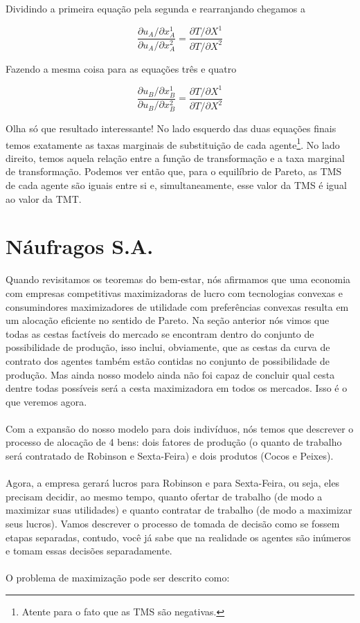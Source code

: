 \documentclass[a4paper,11pt,oneside]{book}
\theoremstyle{definition}
\theoremstyle{break}
\begin{document}
Dividindo a primeira equação pela segunda e rearranjando chegamos a

$$ \frac{\partial u_A/\partial x^1_A}{\partial u_A/\partial x^2_A} = \frac{\partial T/\partial X^1}{\partial T/\partial X^2} $$

Fazendo a mesma coisa para as equações três e quatro

$$ \frac{\partial u_B/\partial x^1_B}{\partial u_B/\partial x^2_B} = \frac{\partial T/\partial X^1}{\partial T/\partial X^2} $$

Olha só que resultado interessante! No lado esquerdo das duas equações finais temos exatamente as taxas marginais de substituição de cada agente\footnote{Atente para o fato que as TMS são negativas.}. No lado direito, temos aquela relação entre a função de transformação e a taxa marginal de transformação. Podemos ver então que, para o equilíbrio de Pareto, as TMS de cada agente são iguais entre si e, simultaneamente, esse valor da TMS é igual ao valor da TMT.

\section{Náufragos S.A.}

Quando revisitamos os teoremas do bem-estar, nós afirmamos que uma economia com empresas competitivas maximizadoras de lucro com tecnologias convexas e consumindores maximizadores de utilidade com preferências convexas resulta em um alocação eficiente no sentido de Pareto. Na seção anterior nós vimos que todas as cestas factíveis do mercado se encontram dentro do conjunto de possibilidade de produção, isso inclui, obviamente, que as cestas da curva de contrato dos agentes também estão contidas no conjunto de possibilidade de produção. Mas ainda nosso modelo ainda não foi capaz de concluir qual cesta dentre todas possíveis será a cesta maximizadora em todos os mercados. Isso é o que veremos agora.
\\~\\
Com a expansão do nosso modelo para dois indivíduos, nós temos que descrever o processo de alocação de 4 bens: dois fatores de produção (o quanto de trabalho será contratado de Robinson e Sexta-Feira) e dois produtos (Cocos e Peixes).
\\~\\
Agora, a empresa gerará lucros para Robinson e para Sexta-Feira, ou seja, eles precisam decidir, ao mesmo tempo, quanto ofertar de trabalho (de modo a maximizar suas utilidades) e quanto contratar de trabalho (de modo a  maximizar seus lucros). Vamos descrever o processo de tomada de decisão como se fossem etapas separadas, contudo, você já sabe que na realidade os agentes são inúmeros e tomam essas decisões separadamente.
\\~\\
O problema de maximização pode ser descrito como:
\end{document}
